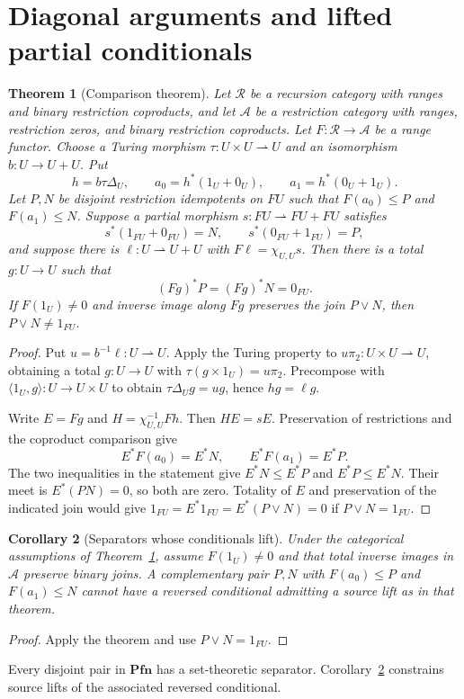 \documentclass[11pt]{article}
\newtheorem{theorem}{Theorem}[section]
\newtheorem{corollary}[theorem]{Corollary}
\theoremstyle{definition}\newtheorem{definition}[theorem]{Definition}
\newcommand{\Pfn}{\mathbf{Pfn}}
\newcommand{\R}{\mathscr R}
\newcommand{\A}{\mathcal A}
\begin{document}
\section{Diagonal arguments and lifted partial conditionals}

\begin{theorem}[Comparison theorem]\label{thm:comparison}
Let $\R$ be a recursion category with ranges and binary restriction
coproducts, and let $\A$ be a restriction category with ranges,
restriction zeros, and binary restriction coproducts. Let
$F:\R\to\A$ be a range functor. Choose a Turing morphism
$\tau:U\times U\rightharpoonup U$ and an isomorphism
$b:U\to U+U$. Put
\[
 h=b\tau\Delta_U,\qquad
 a_0=h^*(1_U+0_U),\qquad a_1=h^*(0_U+1_U).
\]
Let $P,N$ be disjoint restriction idempotents on $FU$ such that
$F(a_0)\le P$ and $F(a_1)\le N$. Suppose a partial morphism
$s:FU\rightharpoonup FU+FU$ satisfies
\[
 s^*(1_{FU}+0_{FU})=N,\qquad
 s^*(0_{FU}+1_{FU})=P,
\]
and suppose there is $\ell:U\rightharpoonup U+U$ with
$F\ell=\chi_{U,U}s$.
Then there is a total $g:U\to U$ such that
\[
 (Fg)^*P=(Fg)^*N=0_{FU}.
\]
If $F(1_U)\ne0$ and inverse image along $Fg$ preserves the join
$P\vee N$, then $P\vee N\ne1_{FU}$.
\end{theorem}
\begin{proof}
Put $u=b^{-1}\ell:U\rightharpoonup U$. Apply the Turing property
to $u\pi_2:U\times U\rightharpoonup U$, obtaining a total
$g:U\to U$ with $\tau(g\times1_U)=u\pi_2$.
Precompose with $\langle1_U,g\rangle:U\to U\times U$ to obtain
$\tau\Delta_Ug=ug$, hence $hg=\ell g$.

Write $E=Fg$ and $H=\chi_{U,U}^{-1}Fh$. Then $HE=sE$.
Preservation of restrictions and the coproduct comparison give
\[
 E^*F(a_0)=E^*N,\qquad E^*F(a_1)=E^*P.
\]
The two inequalities in the statement give $E^*N\le E^*P$
and $E^*P\le E^*N$. Their meet is
$E^*(PN)=0$, so both are zero. Totality of $E$ and preservation
of the indicated join would give
$1_{FU}=E^*1_{FU}=E^*(P\vee N)=0$ if $P\vee N=1_{FU}$.
\end{proof}

\begin{corollary}[Separators whose conditionals lift]\label{cor:separator}
Under the categorical assumptions of Theorem~\ref{thm:comparison},
assume $F(1_U)\ne0$ and that total inverse images in $\A$ preserve
binary joins. A complementary pair $P,N$ with
$F(a_0)\le P$ and $F(a_1)\le N$ cannot have a reversed conditional
admitting a source lift as in that theorem.
\end{corollary}
\begin{proof}
Apply the theorem and use $P\vee N=1_{FU}$.
\end{proof}
Every disjoint pair in $\Pfn$ has a set-theoretic separator.
Corollary~\ref{cor:separator} constrains source lifts of the
associated reversed conditional.
\end{document}

